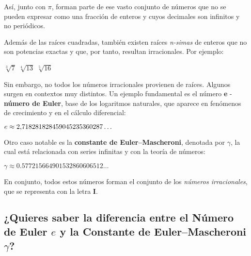 Así, junto con $\pi$, forman parte de ese vasto conjunto de números que no se pueden expresar
como una fracción de enteros y cuyos decimales son infinitos y no periódicos.

Además de las raíces cuadradas, también existen raíces \textit{n-simas} de enteros que no son 
potencias exactas y que, por tanto, resultan irracionales.  
Por ejemplo:  

\begin{ejemplos}[3][\textbullet]
  \task $\sqrt[3]{7}$
  \task $\sqrt[4]{13}$
  \task $\sqrt[5]{16}$
\end{ejemplos}


Sin embargo, no todos los números irracionales provienen de raíces.  
Algunos surgen en contextos muy distintos.  
Un ejemplo fundamental es el número \textbf{e} - \textbf{número de Euler}, base de los logaritmos 
naturales, que aparece en fenómenos de crecimiento y en el cálculo diferencial:  

\begin{ejemplos}[1][\textbullet]
  \task $e \approx \numes{2.718281828459045235360287}\ldots$
\end{ejemplos}

Otro caso notable es la \textbf{constante de Euler--Mascheroni}, denotada por $\gamma$, la cual 
está relacionada con series infinitas y con la teoría de números:  

\begin{ejemplos}[1][\textbullet]
  \task $\gamma \approx \num{0.577215664901532860606512}\ldots$
\end{ejemplos}

En conjunto, todos estos números forman el conjunto de los \textit{números irracionales}, 
que se representa con la letra $\mathbf{I}$.

\subsection*{¿Quieres saber la diferencia entre el Número de Euler $e$ y la Constante de Euler--Mascheroni $\gamma$?}


